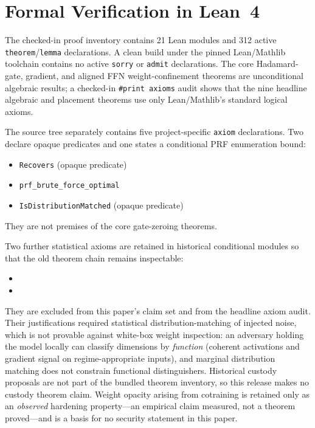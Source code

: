 \documentclass[11pt,a4paper]{article}
\begin{document}
\section{Formal Verification in Lean~4}
\label{sec:formal}

The checked-in proof inventory contains 21 Lean modules and 312 active
\texttt{theorem}/\texttt{lemma} declarations.  A clean build under
the pinned Lean/Mathlib toolchain contains no active \texttt{sorry}
or \texttt{admit} declarations.  The core Hadamard-gate, gradient,
and aligned FFN weight-confinement theorems are unconditional
algebraic results; a checked-in \texttt{\#print axioms} audit shows
that the nine headline algebraic and placement theorems use only
Lean/Mathlib's standard logical axioms.

The source tree separately contains five project-specific
\texttt{axiom} declarations.  Two declare opaque predicates and one
states a conditional PRF enumeration bound:
\begin{itemize}[nosep]
    \item \texttt{Recovers} (opaque predicate)
    \item \texttt{prf\_brute\_force\_optimal}
    \item \texttt{IsDistributionMatched} (opaque predicate)
\end{itemize}
They are not premises of the core gate-zeroing theorems.

Two further statistical axioms are retained in historical
conditional modules so that the old theorem chain remains
inspectable:
\begin{itemize}[nosep]
    \item {}
    \item {}
\end{itemize}
They are excluded from this paper's claim set and from the headline
axiom audit. Their justifications required
statistical distribution-matching of injected noise, which is not
provable against white-box weight inspection: an adversary holding
the model locally can classify dimensions by \emph{function} (coherent
activations and gradient signal on regime-appropriate inputs), and
marginal distribution matching does not constrain functional
distinguishers. Historical custody proposals are not part of the bundled
theorem inventory, so this release makes no custody theorem claim. Weight
opacity arising from cotraining is retained only as an \emph{observed}
hardening property---an empirical claim measured, not a theorem proved---and
is a basis for no security statement in this paper.
\end{document}
